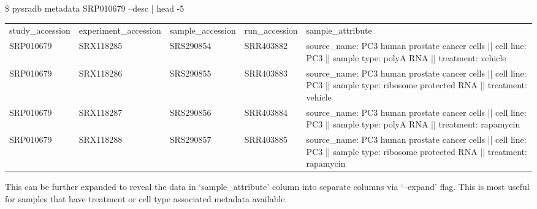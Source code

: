 \documentclass[9pt,a4paper]{extarticle}
\newenvironment{allintypewriter}{\ttfamily}{\par}
\begin{document}
\begin{allintypewriter}
\$ pysradb metadata SRP010679 --desc | head -5
\begin{table}[H]
    \begin{tabular}{llllp{40mm}}
study_accession & experiment_accession & sample_accession & run_accession & sample_attribute\\
SRP010679 & SRX118285 & SRS290854 & SRR403882 & source_name: PC3 human prostate cancer cells || cell line: PC3 || sample type: polyA RNA || treatment: vehicle\\
SRP010679 & SRX118286 & SRS290855 & SRR403883 & source_name: PC3 human prostate cancer cells || cell line: PC3 || sample type: ribosome protected RNA || treatment: vehicle\\
SRP010679 & SRX118287 & SRS290856 & SRR403884 & source_name: PC3 human prostate cancer cells || cell line: PC3 || sample type: polyA RNA || treatment: rapamycin\\
SRP010679 & SRX118288 & SRS290857 & SRR403885 & source_name: PC3 human prostate cancer cells || cell line: PC3 || sample type: ribosome protected RNA || treatment: rapamycin\\
    \end{tabular}
\end{table}
\end{allintypewriter}
\begin{comment}
SRP010679 & SRX118289 & SRS290858 & SRR403886 & source_name: PC3 human prostate cancer cells || cell line: PC3 || sample type: polyA RNA || treatment: PP242\\
SRP010679 & SRX118289 & SRS290858 & SRR403886 & source_name: PC3 human prostate cancer cells || cell line: PC3 || sample type: polyA RNA || treatment: PP242\\
SRP010679 & SRX118290 & SRS290859 & SRR403887 & source_name: PC3 human prostate cancer cells || cell line: PC3 || sample type: ribosome protected RNA || treatment: PP242\\
SRP010679 & SRX118291 & SRS290860 & SRR403888 & source_name: PC3 human prostate cancer cells || cell line: PC3 || sample type: polyA RNA || treatment: vehicle\\
SRP010679 & SRX118292 & SRS290861 & SRR403889 & source_name: PC3 human prostate cancer cells || cell line: PC3 || sample type: ribosome protected RNA || treatment: vehicle\\
\end{comment}
This can be further expanded to reveal the data in `sample\_attribute' column into
separate columns via `--expand' flag. This is most useful for samples that have treatment or cell type associated
metadata available.\\
\end{document}
